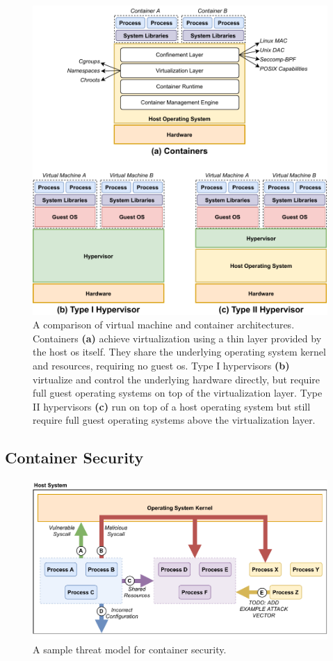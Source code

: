 \begin{figure}[tbp]
  \centering
  \includegraphics[width=0.8\linewidth]{figs/background/virtualization.pdf}
  \caption[A comparison of virtual machine and container architectures]{
    A comparison of virtual machine and container architectures. Containers \textbf{(a)}
    achieve virtualization using a thin layer provided by the host \gls{os}
    itself. They share the underlying operating system kernel and resources, requiring no
    guest \gls{os}. Type I hypervisors \textbf{(b)} virtualize and control the
    underlying hardware directly, but require full guest operating systems on top of the
    virtualization layer. Type II hypervisors \textbf{(c)} run on top of a host operating
    system but still require full guest operating systems above the virtualization layer.
  }%
  \label{fig:virt}
\end{figure}

\subsection{Container Security}%
\label{ss:container-security-bg}

\begin{figure}[tbp]
  \centering
  \includegraphics[width=0.8\linewidth]{figs/background/container_security.pdf}
  \caption[A sample threat model for container security]{
    A sample threat model for container security.
  }%
  \label{fig:containersec}
\end{figure}






